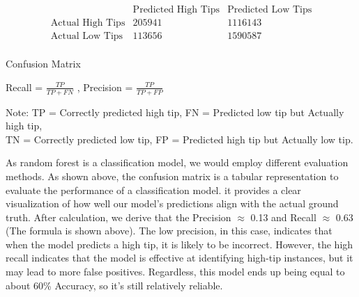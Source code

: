\documentclass[11pt]{article}
\begin{document}
\begin{table}[ht]
\centering
\[
\begin{array}{c|cc}
& \text{Predicted High Tips} & \text{Predicted Low Tips} \\
\hline
\text{Actual High Tips} & 205941 & 1116143 \\
\text{Actual Low Tips} & 113656 & 1590587 \\
\end{array}
\]
\caption{Confusion Matrix}
\end{table}

\begin{center}
    
Recall = $\frac{TP}{TP + FN}$ , \quad Precision = $\frac{TP}{TP + FP}$

\small{Note: TP = Correctly predicted high tip, FN = Predicted low tip but Actually high tip, \\
TN = Correctly predicted low tip, FP = Predicted high tip but Actually low tip.}
\end{center}
As random forest is a classification model, we would employ different evaluation methods. As shown above, the confusion matrix is a tabular representation to evaluate the performance of a classification model. it provides a clear visualization of how well our model's predictions align with the actual ground truth. After calculation, we derive that the Precision $\approx$ 0.13 and Recall $\approx$ 0.63 (The formula is shown above). The low precision, in this case, indicates that when the model predicts a high tip, it is likely to be incorrect. However, the high recall indicates that the model is effective at identifying high-tip instances, but it may lead to more false positives. Regardless, this model ends up being equal to about 60\% Accuracy, so it's still relatively reliable.
\end{document}
